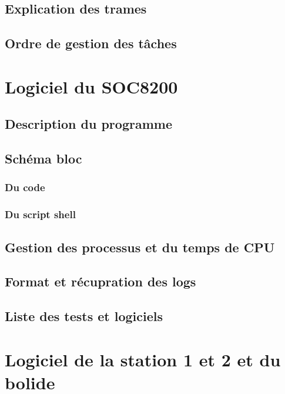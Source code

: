 \documentclass[10pt,a4paper,final]{article}
\begin{document}
\begin{spacing}{1.5}
\subsection{Explication des trames}

\subsection{Ordre de gestion des tâches}





\pagebreak
\section{Logiciel du SOC8200}
\subsection{Description du programme}

\subsection{Schéma bloc}
\subsubsection{Du code}

\subsubsection{Du script shell}

\subsection{Gestion des processus et du temps de CPU}

\subsection{Format et récupration des logs}

\subsection{Liste des tests et logiciels}






\pagebreak
\section{Logiciel de la station 1 et 2 et du bolide}


\end{spacing}
\end{document}
